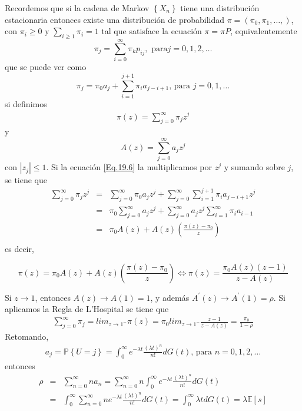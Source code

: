\documentclass{article}
\newcommand{\esp}{\mathbb{E}}
\newcommand{\prob}{\mathbb{P}}
\numberwithin{equation}{section}
\begin{document}
Recordemos que si la cadena de Markov $\left\{X_{n}\right\}$ tiene una distribuci\'on estacionaria entonces existe una distribuci\'on de probabilidad $\pi=\left(\pi_{0},\pi_{1},\ldots,\right)$, con $\pi_{i}\geq0$ y $\sum_{i\geq1}\pi_{i}=1$ tal que satisface la
ecuaci\'on $\pi=\pi P$, equivalentemente
\begin{equation}\label{Eq.18.9}
\pi_{j}=\sum_{i=0}^{\infty}\pi_{k}p_{ij},\textrm{ para
}j=0,1,2,\ldots
\end{equation}
que se puede ver como
\begin{equation}\label{Eq.19.6}
\pi_{j}=\pi_{0}a_{j}+\sum_{i=1}^{j+1}\pi_{i}a_{j-i+1}\textrm{,
para }j=0,1,\ldots
\end{equation}
si definimos
\begin{eqnarray}
\pi\left(z\right)=\sum_{j=0}^{\infty}\pi_{j}z^{j}
\end{eqnarray}
y 
\begin{equation}
A\left(z\right)=\sum_{j=0}^{\infty}a_{j}z^{j}
\end{equation}
con $|z_{j}|\leq1$. Si la ecuaci\'on \ref{Eq.19.6} la multiplicamos por $z^{j}$ y sumando sobre $j$, se tiene que
\begin{eqnarray*}
\sum_{j=0}^{\infty}\pi_{j}z^{j}&=&\sum_{j=0}^{\infty}\pi_{0}a_{j}z^{j}+\sum_{j=0}^{\infty}\sum_{i=1}^{j+1}\pi_{i}a_{j-i+1}z^{j}\\
&=&\pi_{0}\sum_{j=0}^{\infty}a_{j}z^{j}+\sum_{j=0}^{\infty}a_{j}z^{j}\sum_{i=1}^{\infty}\pi_{i}a_{i-1}\\
&=&\pi_{0}A\left(z\right)+A\left(z\right)\left(\frac{\pi\left(z\right)-\pi_{0}}{z}\right)\\
\end{eqnarray*}
es decir,

\begin{equation}
\pi\left(z\right)=\pi_{0}A\left(z\right)+A\left(z\right)\left(\frac{\pi\left(z\right)-\pi_{0}}{z}\right)\Leftrightarrow\pi\left(z\right)=\frac{\pi_{0}A\left(z\right)\left(z-1\right)}{z-A\left(z\right)}
\end{equation}

Si $z\rightarrow1$, entonces $A\left(z\right)\rightarrow A\left(1\right)=1$, y adem\'as $A^{'}\left(z\right)\rightarrow A^{'}\left(1\right)=\rho$. Si aplicamos la Regla de L'Hospital se tiene que
\begin{eqnarray*}
\sum_{j=0}^{\infty}\pi_{j}=lim_{z\rightarrow1^{-}}\pi\left(z\right)=\pi_{0}lim_{z\rightarrow1^{-}}\frac{z-1}{z-A\left(z\right)}=\frac{\pi_{0}}{1-\rho}
\end{eqnarray*}
Retomando,
\begin{eqnarray*}
a_{j}=\prob\left\{U=j\right\}=\int_{0}^{\infty}e^{-\lambda
t}\frac{\left(\lambda t\right)^{n}}{n!}dG\left(t\right)\textrm{,
para }n=0,1,2,\ldots
\end{eqnarray*}
entonces
\begin{eqnarray*}
\rho&=&\sum_{n=0}^{\infty}na_{n}=\sum_{n=0}^{\infty}n\int_{0}^{\infty}e^{-\lambda t}\frac{\left(\lambda t\right)^{n}}{n!}dG\left(t\right)\\
&=&\int_{0}^{\infty}\sum_{n=0}^{\infty}ne^{-\lambda
t}\frac{\left(\lambda
t\right)^{n}}{n!}dG\left(t\right)=\int_{0}^{\infty}\lambda
tdG\left(t\right)=\lambda\esp\left[s\right]
\end{eqnarray*}
\end{document}
